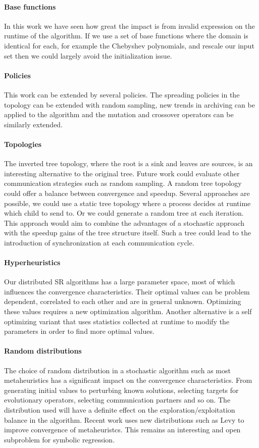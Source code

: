 \paragraph{Base functions}
In this work we have seen how great the impact is from invalid expression on the runtime of the algorithm. If we use a set of base functions where the domain is identical for each, for example the Chebyshev polynomials, and rescale our input set then we could largely avoid the initialization issue.

\paragraph{Policies}
This work can be extended by several policies. The spreading policies in the topology can be extended with random sampling, new trends in archiving can be applied to the algorithm and the mutation and crossover operators can be similarly extended. 

\paragraph{Topologies}
The inverted tree topology, where the root is a sink and leaves are sources, is an interesting alternative to the original tree. Future work could evaluate other communication strategies such as random sampling. A random tree topology could offer a balance between convergence and speedup. Several approaches are possible, we could use a static tree topology where a process decides at runtime which child to send to. Or we could generate a random tree at each iteration. This approach would aim to combine the advantages of a stochastic approach with the speedup gains of the tree structure itself. Such a tree could lead to the introduction of synchronization at each communication cycle.

\paragraph{Hyperheuristics}
Our distributed SR algorithms has a large parameter space, most of which influences the convergence characteristics. Their optimal values can be problem dependent, correlated to each other and are in general unknown. Optimizing these values requires a new optimization algorithm. Another alternative is a self optimizing variant that uses statistics collected at runtime to modify the parameters in order to find more optimal values.

\paragraph{Random distributions}
The choice of random distribution in a stochastic algorithm such as most metaheuristics has a significant impact on the convergence characteristics. From generating initial values to perturbing known solutions, selecting targets for evolutionary operators, selecting communication partners and so on. The distribution used will have a definite effect on the exploration/exploitation balance in the algorithm. Recent work uses new distributions such as Levy \citep{ABCLevy} to improve convergence of metaheuristcs. This remains an interesting and open subproblem for symbolic regression. 

